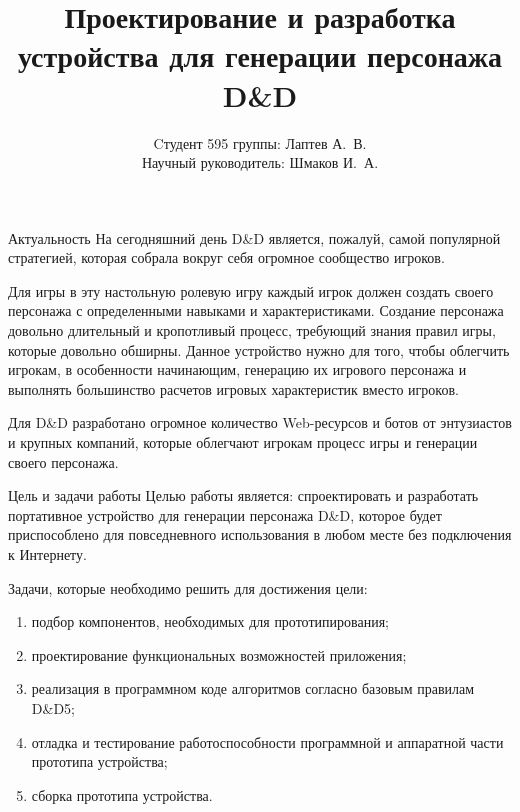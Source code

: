 \documentclass[12pt,a4paper,mathserif]{beamer}
\author[Лаптев А.В.]{{Cтудент 595 группы: Лаптев А.~В.}\\
{Научный руководитель: Шмаков И.~А.}}
\title[Барнаул 2023]{Проектирование и разработка устройства для генерации персонажа D\&D}
\begin{document}
\begin{frame}
\maketitle
\end{frame}

\begin{frame}{Актуальность}
    \setlength{\parindent}{0.5cm}
    На сегодняшний день D\&D является, пожалуй, самой популярной стратегией, которая собрала вокруг себя огромное сообщество игроков.

    Для игры в эту настольную ролевую игру каждый игрок должен создать своего персонажа с определенными навыками и характеристиками. Создание персонажа довольно длительный и кропотливый процесс, требующий знания правил игры, которые довольно обширны. Данное устройство нужно для того, чтобы облегчить игрокам, в особенности начинающим, генерацию их игрового персонажа и выполнять большинство расчетов игровых характеристик вместо игроков.
    
    Для D\&D разработано огромное количество Web-ресурсов и ботов от энтузиастов и крупных компаний, которые облегчают игрокам процесс игры и генерации своего персонажа.
\end{frame}

\begin{frame}{Цель и задачи работы}
    \setlength{\parindent}{0.5cm}
    Целью работы является: спроектировать и разработать портативное устройство для генерации персонажа D\&D, которое будет приспособлено для повседневного использования в любом месте без подключения к Интернету.

    Задачи, которые необходимо решить для достижения цели:

    \begin{enumerate}
        \item подбор компонентов, необходимых для прототипирования;
        
        \item проектирование функциональных возможностей приложения;
        
        \item реализация в программном коде алгоритмов согласно базовым правилам D\&D5;
        
        \item отладка и тестирование работоспособности программной и аппаратной части прототипа устройства;
        
        \item сборка прототипа устройства.
    \end{enumerate}
\end{frame}
\end{document}
